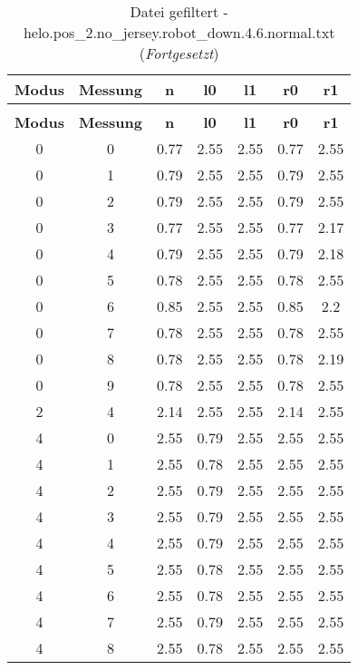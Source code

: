 \clearpage{}
\begin{longtable}{|c|c||c||c|c||c|c|}
	\caption{Datei gefiltert - helo.pos\_2.no\_jersey.robot\_down.4.6.normal.txt} \label{tab:helo.pos-2.no-jersey.robot-down.4.6.normal.txt} \\ \hline
	\textbf{Modus} & \textbf{Messung} & \textbf{n} & \textbf{l0} & \textbf{l1} & \textbf{r0} & \textbf{r1}\\ \hline
	\endfirsthead
	\caption[]{Datei gefiltert - helo.pos\_2.no\_jersey.robot\_down.4.6.normal.txt (\emph{Fortgesetzt})} \\ \hline
	\textbf{Modus} & \textbf{Messung} & \textbf{n} & \textbf{l0} & \textbf{l1} & \textbf{r0} & \textbf{r1}\\ \hline
	\endhead
	0 & 0 & 0.77 & 2.55 & 2.55 & 0.77 & 2.55 \\ \hline
	0 & 1 & 0.79 & 2.55 & 2.55 & 0.79 & 2.55 \\ \hline
	0 & 2 & 0.79 & 2.55 & 2.55 & 0.79 & 2.55 \\ \hline
	0 & 3 & 0.77 & 2.55 & 2.55 & 0.77 & 2.17 \\ \hline
	0 & 4 & 0.79 & 2.55 & 2.55 & 0.79 & 2.18 \\ \hline
	0 & 5 & 0.78 & 2.55 & 2.55 & 0.78 & 2.55 \\ \hline
	0 & 6 & 0.85 & 2.55 & 2.55 & 0.85 & 2.2 \\ \hline
	0 & 7 & 0.78 & 2.55 & 2.55 & 0.78 & 2.55 \\ \hline
	0 & 8 & 0.78 & 2.55 & 2.55 & 0.78 & 2.19 \\ \hline
	0 & 9 & 0.78 & 2.55 & 2.55 & 0.78 & 2.55 \\ \hline
	2 & 4 & 2.14 & 2.55 & 2.55 & 2.14 & 2.55 \\ \hline
	4 & 0 & 2.55 & 0.79 & 2.55 & 2.55 & 2.55 \\ \hline
	4 & 1 & 2.55 & 0.78 & 2.55 & 2.55 & 2.55 \\ \hline
	4 & 2 & 2.55 & 0.79 & 2.55 & 2.55 & 2.55 \\ \hline
	4 & 3 & 2.55 & 0.79 & 2.55 & 2.55 & 2.55 \\ \hline
	4 & 4 & 2.55 & 0.79 & 2.55 & 2.55 & 2.55 \\ \hline
	4 & 5 & 2.55 & 0.78 & 2.55 & 2.55 & 2.55 \\ \hline
	4 & 6 & 2.55 & 0.78 & 2.55 & 2.55 & 2.55 \\ \hline
	4 & 7 & 2.55 & 0.79 & 2.55 & 2.55 & 2.55 \\ \hline
	4 & 8 & 2.55 & 0.78 & 2.55 & 2.55 & 2.55 \\ \hline

\end{longtable}
